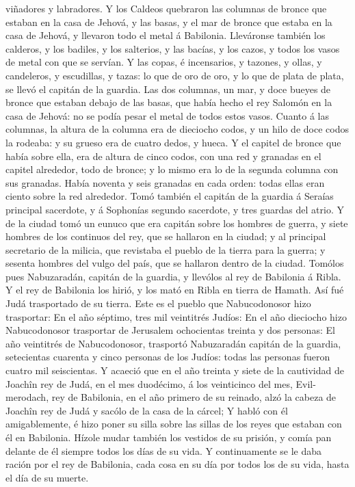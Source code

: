 viñadores y labradores.  Y los Caldeos quebraron las
columnas de bronce que estaban en la casa de Jehová, y las basas, y el
mar de bronce que estaba en la casa de Jehová, y llevaron todo el metal
á Babilonia.  Lleváronse también los calderos, y los
badiles, y los salterios, y las bacías, y los cazos, y todos los vasos
de metal con que se servían.  Y las copas, é incensarios, y
tazones, y ollas, y candeleros, y escudillas, y tazas: lo que de oro de
oro, y lo que de plata de plata, se llevó el capitán de la guardia.
 Las dos columnas, un mar, y doce bueyes de bronce que
estaban debajo de las basas, que había hecho el rey Salomón en la casa
de Jehová: no se podía pesar el metal de todos estos vasos.
 Cuanto á las columnas, la altura de la columna era de
dieciocho codos, y un hilo de doce codos la rodeaba: y su grueso era de
cuatro dedos, y hueca.  Y el capitel de bronce que había
sobre ella, era de altura de cinco codos, con una red y granadas en el
capitel alrededor, todo de bronce; y lo mismo era lo de la segunda
columna con sus granadas.  Había noventa y seis granadas en
cada orden: todas ellas eran ciento sobre la red alrededor.
 Tomó también el capitán de la guardia á Seraías principal
sacerdote, y á Sophonías segundo sacerdote, y tres guardas del atrio.
 Y de la ciudad tomó un eunuco que era capitán sobre los
hombres de guerra, y siete hombres de los continuos del rey, que se
hallaron en la ciudad; y al principal secretario de la milicia, que
revistaba el pueblo de la tierra para la guerra; y sesenta hombres del
vulgo del país, que se hallaron dentro de la ciudad. 
Tomólos pues Nabuzaradán, capitán de la guardia, y llevólos al rey de
Babilonia á Ribla.  Y el rey de Babilonia los hirió, y los
mató en Ribla en tierra de Hamath. Así fué Judá trasportado de su
tierra.  Este es el pueblo que Nabucodonosor hizo
trasportar: En el año séptimo, tres mil veintitrés Judíos: 
En el año dieciocho hizo Nabucodonosor trasportar de Jerusalem
ochocientas treinta y dos personas:  El año veintitrés de
Nabucodonosor, trasportó Nabuzaradán capitán de la guardia, setecientas
cuarenta y cinco personas de los Judíos: todas las personas fueron
cuatro mil seiscientas.  Y acaeció que en el año treinta y
siete de la cautividad de Joachîn rey de Judá, en el mes duodécimo, á
los veinticinco del mes, Evil-merodach, rey de Babilonia, en el año
primero de su reinado, alzó la cabeza de Joachîn rey de Judá y sacólo de
la casa de la cárcel;  Y habló con él amigablemente, é hizo
poner su silla sobre las sillas de los reyes que estaban con él en
Babilonia.  Hízole mudar también los vestidos de su
prisión, y comía pan delante de él siempre todos los días de su vida.
 Y continuamente se le daba ración por el rey de Babilonia,
cada cosa en su día por todos los de su vida, hasta el día de su muerte.
